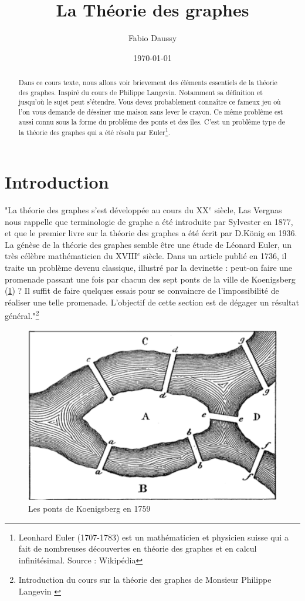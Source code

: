 \documentclass[12pt,a4paper]{scrartcl}
\title{La Théorie des graphes}
\author{Fabio Daussy}
\date{\today}
\theoremstyle{plain}
\theoremstyle{remark}
\begin{document}
\maketitle

\begin{abstract}
Dans ce cours texte, nous allons voir brievement des éléments essentiels de la théorie des graphes. Inspiré du cours de Philippe Langevin.
Notamment sa définition et jusqu'où le sujet peut s'étendre.
Vous devez probablement connaître ce fameux jeu où l'on vous demande de déssiner une maison sans lever le crayon. Ce même problême est aussi connu sous la forme du problême des ponts et des îles. C'est un problême type de la théorie des graphes qui a été résolu par Euler\footnote{Leonhard Euler (1707-1783) est un mathématicien et physicien suisse qui a fait de nombreuses découvertes en théorie des graphes et en calcul infinitésimal. Source : Wikipédia}.
\end{abstract}

\tableofcontents

\section{Introduction}
"La théorie des graphes s’est développée au cours du XX$^e$ siècle,
Las Vergnas nous rappelle que terminologie de graphe a été
introduite par Sylvester en 1877, et que le premier livre sur la théorie
des graphes a été écrit par D.König en 1936. La génèse de la théorie
des graphes semble être une étude de Léonard Euler, un très célèbre
mathématicien du XVIII$^e$ siècle. Dans un article publié en 1736, il traite
un problème devenu classique, illustré par la devinette : peut-on faire
une promenade passant une fois par chacun des sept ponts de la ville
de Koenigsberg (\ref{g.koen}) ? Il suffit de faire quelques essais pour se convaincre
de l’impossibilité de réaliser une telle promenade. L’objectif de cette
section est de dégager un résultat général."\footnote{Introduction du cours sur la théorie des graphes de Monsieur Philippe Langevin \cite{TAG}}

\begin{figure}
	\centering
	\includegraphics[scale=0.25]{pontsiles.png}
	\caption{Les ponts de Koenigsberg en 1759}\label{g.koen}
\end{figure}
\end{document}
